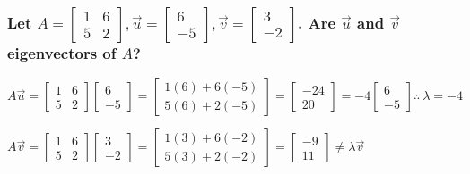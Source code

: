 \documentclass[
  letterpaper,
  DIV=11,
  numbers=noendperiod]{scrartcl}
\begin{document}
\hypertarget{let-a-beginbmatrix-1-6-5-2endbmatrix-vecu-beginbmatrix-6--5endbmatrix-vecv-beginbmatrix3--2-endbmatrix.-are-vecu-and-vecv-eigenvectors-of-a}{%
\subsubsection{\texorpdfstring{Let
\(A = \begin{bmatrix} 1 & 6 \\ 5 & 2\end{bmatrix}, \vec{u} = \begin{bmatrix} 6 \\ -5\end{bmatrix}, \vec{v} = \begin{bmatrix}3 \\ -2 \end{bmatrix}\).
Are \(\vec{u}\) and \(\vec{v}\) eigenvectors of
\(A\)?}{Let A = \textbackslash begin\{bmatrix\} 1 \& 6 \textbackslash\textbackslash{} 5 \& 2\textbackslash end\{bmatrix\}, \textbackslash vec\{u\} = \textbackslash begin\{bmatrix\} 6 \textbackslash\textbackslash{} -5\textbackslash end\{bmatrix\}, \textbackslash vec\{v\} = \textbackslash begin\{bmatrix\}3 \textbackslash\textbackslash{} -2 \textbackslash end\{bmatrix\}. Are \textbackslash vec\{u\} and \textbackslash vec\{v\} eigenvectors of A?}}\label{let-a-beginbmatrix-1-6-5-2endbmatrix-vecu-beginbmatrix-6--5endbmatrix-vecv-beginbmatrix3--2-endbmatrix.-are-vecu-and-vecv-eigenvectors-of-a}}

\(A\vec{u} = \begin{bmatrix} 1 & 6 \\ 5 & 2\end{bmatrix}\begin{bmatrix} 6 \\ -5\end{bmatrix} = \begin{bmatrix} 1(6)+6(-5) \\ 5(6)+2(-5)\end{bmatrix} = \begin{bmatrix} -24 \\ 20\end{bmatrix} = -4\begin{bmatrix}6 \\ -5\end{bmatrix} \therefore \ \lambda = -4\)

\(A\vec{v} = \begin{bmatrix} 1 & 6 \\ 5 & 2\end{bmatrix}\begin{bmatrix} 3 \\ -2\end{bmatrix} = \begin{bmatrix} 1(3)+6(-2) \\ 5(3)+2(-2)\end{bmatrix} = \begin{bmatrix} -9 \\ 11\end{bmatrix} \neq \lambda\vec{v}\)
\end{document}
